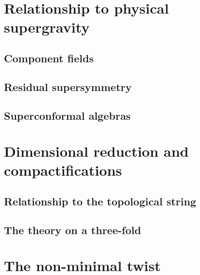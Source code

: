\documentclass[11pt]{amsart}
\begin{document}
\section{Relationship to physical supergravity}

\subsection{Component fields}


\subsection{Residual supersymmetry} 


\subsection{Superconformal algebras}


\section{Dimensional reduction and compactifications} 

\subsection{Relationship to the topological string}


\subsection{The theory on a three-fold}


\section{The non-minimal twist} 
\end{document}
